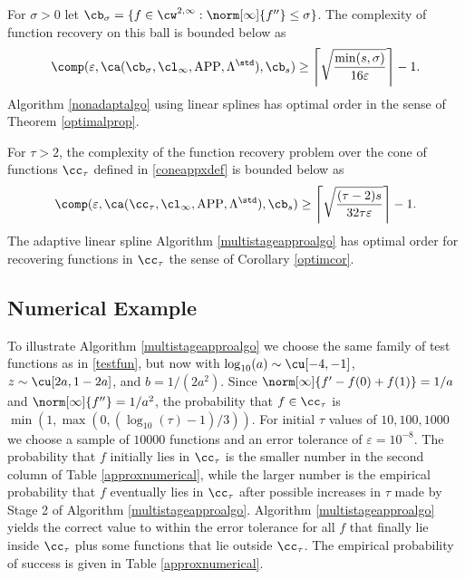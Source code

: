 \begin{theorem} \label{complowbdappr} For $\sigma>0$ let $\cb_{\sigma}=\{f \in \cw^{2,\infty} : \norm[\infty]{f''} \le \sigma\}$.  The complexity of function recovery on this ball is bounded below as
\begin{equation*}
\comp(\varepsilon,\ca(\cb_{\sigma},\cl_\infty,\APP,\Lambda^{\std}),\cb_{s}) \ge \left \lceil \sqrt{\frac{\min(s,\sigma)}{16 \varepsilon}} \right \rceil -1 .
\end{equation*}
Algorithm \ref{nonadaptalgo} using linear splines has optimal order in the sense of Theorem \ref{optimalprop}.

For $\tau>2$, the complexity of the function recovery problem over the cone of functions $\cc_{\tau}$ defined in \eqref{coneappxdef} is bounded below as
\begin{equation*}
\comp(\varepsilon,\ca(\cc_{\tau},\cl_\infty,\APP,\Lambda^{\std}),\cb_{s}) \ge \left \lceil \sqrt{\frac{(\tau-2)s}{32 \tau \varepsilon}} \right \rceil-1 .
\end{equation*}
The adaptive linear spline Algorithm \ref{multistageapproalgo} has optimal order for recovering functions in $\cc_{\tau}$ the sense of Corollary \ref{optimcor}.
\end{theorem}

\subsection{Numerical Example}

To illustrate Algorithm \ref{multistageapproalgo} we choose the same  family of test functions as in \eqref{testfun}, but now with  $\log_{10}(a) \sim \cu[-4,-1]$, $z \sim \cu[2a,1-2a]$, and $b=1/(2a^2)$.   Since $\norm[\infty]{f'-f(0)+f(1)}=1/a$ and $\norm[\infty]{f''}=1/a^2$, the probability that $f \in \cc_{\tau}$ is $\min\left(1,\max(0,\left(\log_{10}(\tau)-1\right)/3)\right).$
For initial $\tau$ values of $10, 100 , 1000$ we choose a sample of  $10000$ functions and an error tolerance of  $\varepsilon = 10^{-8}$.  The probability that $f$ initially lies in $\cc_{\tau}$ is the smaller number in the second column of Table \ref{approxnumerical}, while the larger number is the empirical probability that $f$ eventually lies in $\cc_{\tau}$ after possible increases in $\tau$ made by Stage 2 of Algorithm \ref{multistageapproalgo}.  Algorithm \ref{multistageapproalgo} yields the correct value to within the error tolerance for all $f$ that finally lie inside $\cc_{\tau}$ plus some functions that lie outside $\cc_{\tau}$.  The empirical probability of success is given in Table \ref{approxnumerical}.


